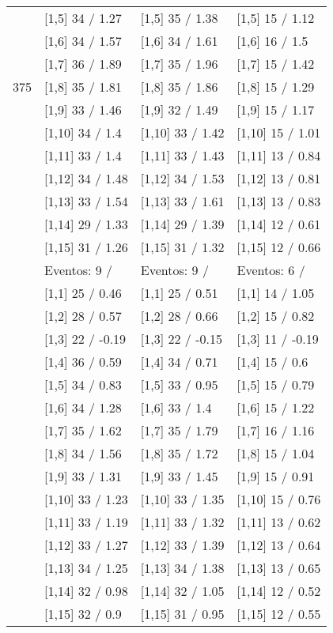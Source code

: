 \begin{table}
\begin{tabular}[t]{llll}
 & {}[1,5] 34  / 1.27 & {}[1,5] 35  / 1.38 & {}[1,5] 15  / 1.12\\
 & {}[1,6] 34  / 1.57 & {}[1,6] 34  / 1.61 & {}[1,6] 16  / 1.5\\
 & {}[1,7] 36  / 1.89 & {}[1,7] 35  / 1.96 & {}[1,7] 15  / 1.42\\
375 & {}[1,8] 35  / 1.81 & {}[1,8] 35  / 1.86 & {}[1,8] 15  / 1.29\\
\addlinespace
 & {}[1,9] 33  / 1.46 & {}[1,9] 32  / 1.49 & {}[1,9] 15  / 1.17\\
 & {}[1,10] 34  / 1.4 & {}[1,10] 33  / 1.42 & {}[1,10] 15  / 1.01\\
 & {}[1,11] 33  / 1.4 & {}[1,11] 33  / 1.43 & {}[1,11] 13  / 0.84\\
 & {}[1,12] 34  / 1.48 & {}[1,12] 34  / 1.53 & {}[1,12] 13  / 0.81\\
 & {}[1,13] 33  / 1.54 & {}[1,13] 33  / 1.61 & {}[1,13] 13  / 0.83\\
\addlinespace
 & {}[1,14] 29  / 1.33 & {}[1,14] 29  / 1.39 & {}[1,14] 12  / 0.61\\
 & {}[1,15] 31  / 1.26 & {}[1,15] 31  / 1.32 & {}[1,15] 12  / 0.66\\
 & Eventos:  9 / & Eventos:  9 / & Eventos:  6 /\\
 & {}[1,1] 25  / 0.46 & {}[1,1] 25  / 0.51 & {}[1,1] 14  / 1.05\\
 & {}[1,2] 28  / 0.57 & {}[1,2] 28  / 0.66 & {}[1,2] 15  / 0.82\\
\addlinespace
 & {}[1,3] 22  / -0.19 & {}[1,3] 22  / -0.15 & {}[1,3] 11  / -0.19\\
 & {}[1,4] 36  / 0.59 & {}[1,4] 34  / 0.71 & {}[1,4] 15  / 0.6\\
 & {}[1,5] 34  / 0.83 & {}[1,5] 33  / 0.95 & {}[1,5] 15  / 0.79\\
 & {}[1,6] 34  / 1.28 & {}[1,6] 33  / 1.4 & {}[1,6] 15  / 1.22\\
 & {}[1,7] 35  / 1.62 & {}[1,7] 35  / 1.79 & {}[1,7] 16  / 1.16\\
\addlinespace
500 & {}[1,8] 34  / 1.56 & {}[1,8] 35  / 1.72 & {}[1,8] 15  / 1.04\\
 & {}[1,9] 33  / 1.31 & {}[1,9] 33  / 1.45 & {}[1,9] 15  / 0.91\\
 & {}[1,10] 33  / 1.23 & {}[1,10] 33  / 1.35 & {}[1,10] 15  / 0.76\\
 & {}[1,11] 33  / 1.19 & {}[1,11] 33  / 1.32 & {}[1,11] 13  / 0.62\\
 & {}[1,12] 33  / 1.27 & {}[1,12] 33  / 1.39 & {}[1,12] 13  / 0.64\\
\addlinespace
 & {}[1,13] 34  / 1.25 & {}[1,13] 34  / 1.38 & {}[1,13] 13  / 0.65\\
 & {}[1,14] 32  / 0.98 & {}[1,14] 32  / 1.05 & {}[1,14] 12  / 0.52\\
 & {}[1,15] 32  / 0.9 & {}[1,15] 31  / 0.95 & {}[1,15] 12  / 0.55\\
\bottomrule
\end{tabular}
\end{table}
